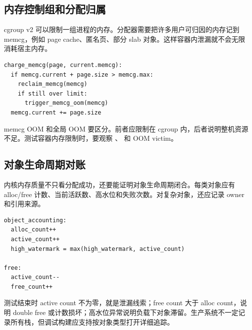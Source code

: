 \subsection{内存控制组和分配归属}

cgroup v2 可以限制一组进程的内存。分配器需要把许多用户可归因的内存记到 memcg，例如 page cache、匿名页、部分 slab 对象。这样容器内泄漏就不会无限消耗宿主内存。

\begin{lstlisting}
charge_memcg(page, current.memcg):
  if memcg.current + page.size > memcg.max:
    reclaim_memcg(memcg)
    if still over limit:
      trigger_memcg_oom(memcg)
  memcg.current += page.size
\end{lstlisting}

memcg OOM 和全局 OOM 要区分。前者应限制在 cgroup 内，后者说明整机资源不足。测试容器内存限制时，要观察 、 和 OOM victim。

\subsection{对象生命周期对账}

内核内存质量不只看分配成功，还要能证明对象生命周期闭合。每类对象应有 alloc/free 计数、当前活跃数、高水位和失败次数。对复杂对象，还应记录 owner 和引用来源。

\begin{lstlisting}
object_accounting:
  alloc_count++
  active_count++
  high_watermark = max(high_watermark, active_count)

free:
  active_count--
  free_count++
\end{lstlisting}

测试结束时 active count 不为零，就是泄漏线索；free count 大于 alloc count，说明 double free 或计数损坏；高水位异常说明负载下对象滞留。生产系统不一定记录所有栈，但调试构建应支持按对象类型打开详细追踪。
